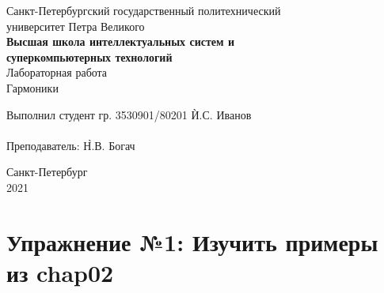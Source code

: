 \documentclass[a4paper, 14pt]{extarticle}
\begin{document}
    \begin{center}
        \begin{center}
            \hfill \break
            \normalsize{Санкт-Петербургский государственный политехнический}\\
            \normalsize{университет Петра Великого}\\
            \hfill \break
            \normalsize{\textbf{Высшая школа интеллектуальных систем и}}\\
            \normalsize{\textbf{суперкомпьютерных технологий}}\\
            \hfill \break
            \hfill \break
            \hfill \break
            \normalsize{Лабораторная работа}\\
            \hfill \break
            \normalsize{\LARGE Гармоники}\\
        \end{center}
        \hfill \break
        \hfill \break
        \hfill \break
        \hfill \break
        \hfill \break
        \hfill \break
        \hfill \break
        \hfill \break
        \hfill \break
        \hfill \break
        \begin{tabbing}
            Выполнил студент гр. 3530901/80201 \`И.С. Иванов\\
            \\
            Преподаватель: \`Н.В. Богач\\
        \end{tabbing}
        \hfill \break
        \hfill \break
        \hfill \break
        \hfill \break
        \begin{center}
            Санкт-Петербург\\
            2021
        \end{center}
        \thispagestyle{empty}
    \end{center}

    \newpage
    \tableofcontents

    \newpage
    \listoffigures

    \newpage
    \lstlistoflistings

    \newpage


    \section{Упражнение №1: Изучить примеры из chap02}
    \label{sec:1_study_examples}
\end{document}
